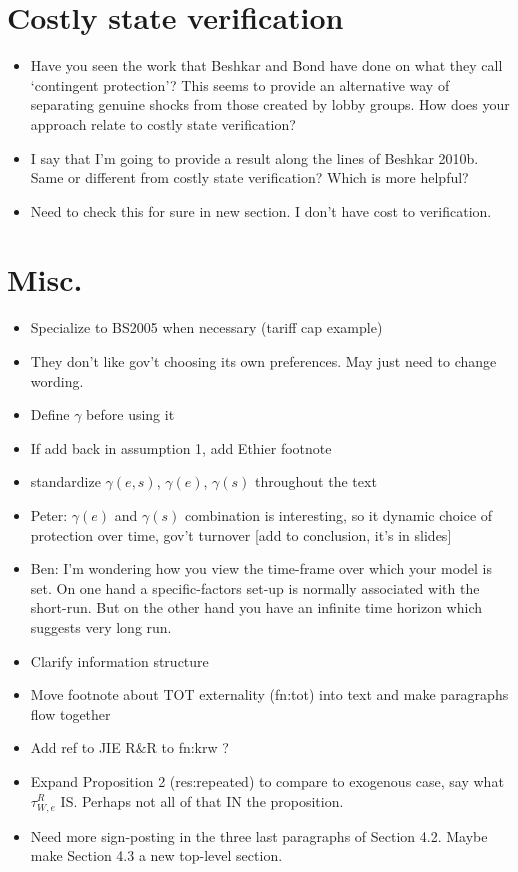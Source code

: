 \documentclass[12pt]{article}
\newcommand{\ga}{\gamma}
\begin{document}
\section{Costly state verification}
		\begin{itemize}
				\item Have you seen the work that Beshkar and Bond have done on what they call `contingent protection'?  This seems to provide an alternative way of separating genuine shocks from those created by lobby groups.  How does your approach relate to costly state verification?
				\item I say that I'm going to provide a result along the lines of Beshkar 2010b. Same or different from costly state verification? Which is more helpful?
				\item Need to check this for sure in new section. I don't have cost to verification.
		\end{itemize}


\section{Misc.}
\begin{itemize}
	\item Specialize to BS2005 when necessary (tariff cap example)
	\item They don't like gov't choosing its own preferences. May just need to change wording.
	\item Define $\ga$ before using it
	\item If add back in assumption 1, add Ethier footnote
	\item standardize $\ga(e,s)$, $\ga(e)$, $\ga(s)$ throughout the text
	\item Peter: $\ga(e)$ and $\ga(s)$ combination is interesting, so it dynamic choice of protection over time, gov't turnover [add to conclusion, it's in slides]
	\item Ben: I'm wondering how you view the time-frame over which your model is set.  On one hand a specific-factors set-up is normally associated with the short-run.  But on the other hand you have an infinite time horizon which suggests very long run.
	\item Clarify information structure
	\item Move footnote about TOT externality (fn:tot) into text and make paragraphs flow together
	\item Add ref to JIE R$\&$R to fn:krw ?
	\item Expand Proposition 2 (res:repeated) to compare to exogenous case, say what $\tau^R_{W,e}$ IS. Perhaps not all of that IN the proposition.
	\item Need more sign-posting in the three last paragraphs of Section 4.2. Maybe make Section 4.3 a new top-level section.
\end{itemize}
\end{document}
